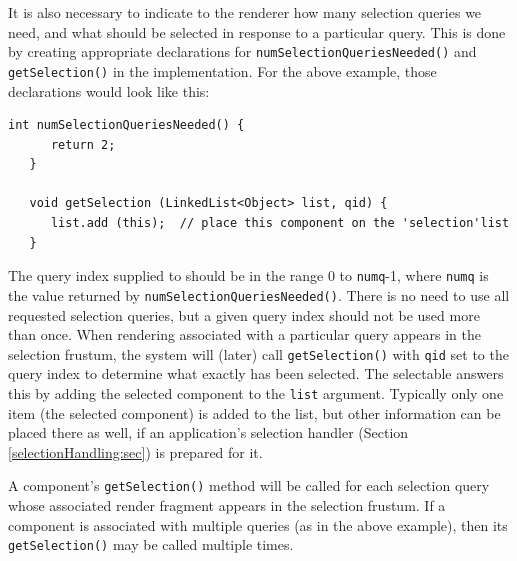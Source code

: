 It is also necessary to indicate to the renderer how many selection
queries we need, and what should be selected in response to a
particular query. This is done by creating appropriate declarations
for {\tt numSelectionQueriesNeeded()} and {\tt getSelection()}
in the 
 implementation.
For the above example, those declarations would look like this:
\begin{lstlisting}[]
   int numSelectionQueriesNeeded() {
      return 2;
   }

   void getSelection (LinkedList<Object> list, qid) {
      list.add (this);  // place this component on the 'selection'list
   }
\end{lstlisting}
The query index supplied to 
should be in the range 0 to {\tt numq}-1, where {\tt numq} is the
value returned by {\tt numSelectionQueriesNeeded()}. There is no need
to use all requested selection queries, but a given query index should
not be used more than once. When rendering associated with a
particular query appears in the selection frustum, the system will
(later) call {\tt getSelection()} with {\tt qid} set to the query index to
determine what exactly has been selected. The selectable answers this
by adding the selected component to the {\tt list} argument.
Typically only one item (the selected component) is added to the list,
but other information can be placed there as well, if an
application's selection handler (Section \ref{selectionHandling:sec})
is prepared for it.

\begin{sideblock}
A component's {\tt getSelection()} method will be called for each
selection query whose associated render fragment appears in the
selection frustum. If a component is associated with multiple queries
(as in the above example), then its {\tt getSelection()} may be called
multiple times.
\end{sideblock}


